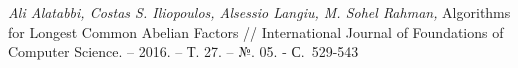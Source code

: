 \begin{thebibliography}{99}

{\it Ali Alatabbi, Costas S. Iliopoulos, Alsessio Langiu, M. Sohel Rahman,}
Algorithms for Longest Common Abelian Factors /\!/
International Journal of Foundations of Computer Science. – 2016. – Т. 27. – №. 05. - С.~529-543

\end{thebibliography}


